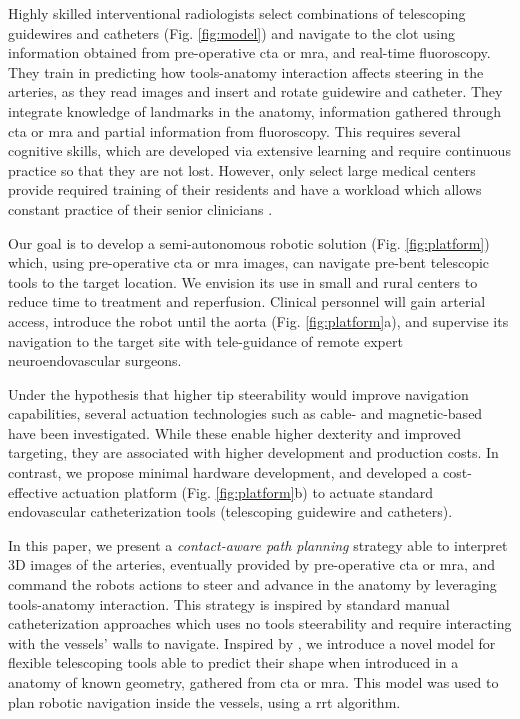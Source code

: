 Highly skilled interventional radiologists select combinations of telescoping guidewires and catheters (Fig. \ref{fig:model}) and navigate to the clot using information obtained from pre-operative \gls{cta} or \gls{mra}, and real-time fluoroscopy. They train in predicting how tools-anatomy interaction affects steering in the arteries, as they read images and insert and rotate guidewire and catheter. They integrate knowledge of landmarks in the anatomy, information gathered through \gls{cta} or \gls{mra} and partial information from fluoroscopy. This requires several cognitive skills, which are developed via extensive learning and require continuous practice so that they are not lost. However, only select large medical centers provide required training of their residents and have a workload which allows constant practice of their senior clinicians \cite{Hammond2020Urban-RuralMortality}.

Our goal is to develop a semi-autonomous robotic solution (Fig. \ref{fig:platform}) which, using pre-operative \gls{cta} or \gls{mra} images, can navigate pre-bent telescopic tools to the target location. We envision its use in small and rural centers to reduce time to treatment and reperfusion. Clinical personnel will gain arterial access, introduce the robot until the aorta (Fig. \ref{fig:platform}a), and supervise its navigation to the target site with tele-guidance of remote expert neuroendovascular surgeons. 

Under the hypothesis that higher tip steerability would improve navigation capabilities, several actuation technologies such as cable- \cite{Lis2022DesignRobot, Abah2024Self-SteeringInterventions} and magnetic-based \cite{Kim2022TeleroboticManipulation, Dreyfus2024DexterousAccess, Brockdorff2024HybridApplications, Pittiglio2022Patient-SpecificEndoscopy, Pittiglio2023PersonalizedLungs, Dreyfus2024DexterousAccessb} have been investigated. While these enable higher dexterity and improved targeting, they are associated with higher development and production costs. In contrast, we propose minimal hardware development, and developed a cost-effective actuation platform (Fig. \ref{fig:platform}b) to actuate standard endovascular catheterization tools (telescoping guidewire and catheters). 

In this paper, we present a \emph{contact-aware path planning} strategy able to interpret 3D images of the arteries, eventually provided by pre-operative \gls{cta} or \gls{mra}, and command the robots actions to steer and advance in the anatomy by leveraging tools-anatomy interaction. This strategy is inspired by standard manual catheterization approaches which uses no tools steerability and require interacting with the vessels' walls to navigate. Inspired by \cite{Pittiglio2023ClosedRobots}, we introduce a novel model for flexible telescoping tools able to predict their shape when introduced in a anatomy of known geometry, gathered from \gls{cta} or \gls{mra}. This model was used to plan robotic navigation inside the vessels, using a \gls{rrt} algorithm.

